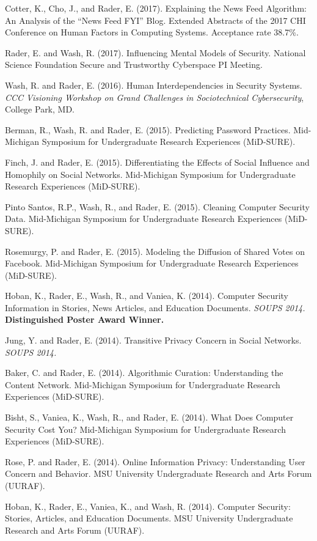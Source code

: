 \documentclass[9pt]{extarticle}
\begin{document}
Cotter, K., Cho, J., and Rader, E. (2017). Explaining the News Feed Algorithm: An Analysis of the ``News Feed FYI'' Blog. Extended Abstracts of the 2017 CHI Conference on Human Factors in Computing Systems. Acceptance rate 38.7\%.

Rader, E. and Wash, R. (2017). Influencing Mental Models of Security. National Science Foundation Secure and Trustworthy Cyberspace PI Meeting.

Wash, R. and Rader, E. (2016). Human Interdependencies in Security Systems. \emph{CCC Visioning Workshop on Grand Challenges in Sociotechnical Cybersecurity}, College Park, MD.

Berman, R., Wash, R. and Rader, E. (2015). Predicting Password Practices. Mid-Michigan Symposium for Undergraduate Research Experiences (MiD-SURE).

Finch, J. and Rader, E. (2015). Differentiating the Effects of Social Influence and Homophily on Social Networks. Mid-Michigan Symposium for Undergraduate Research Experiences (MiD-SURE).

Pinto Santos, R.P., Wash, R., and Rader, E. (2015). Cleaning Computer Security Data. Mid-Michigan Symposium for Undergraduate Research Experiences (MiD-SURE).

Rosemurgy, P. and Rader, E. (2015). Modeling the Diffusion of Shared Votes on Facebook. Mid-Michigan Symposium for Undergraduate Research Experiences (MiD-SURE).

Hoban, K., Rader, E., Wash, R., and Vaniea, K. (2014). Computer Security Information in Stories, News Articles, and Education Documents. \emph{SOUPS 2014.} \textbf{Distinguished Poster Award Winner.}

Jung, Y. and Rader, E. (2014). Transitive Privacy Concern in Social Networks. \emph{SOUPS 2014.}

Baker, C. and Rader, E. (2014). Algorithmic Curation: Understanding the Content Network. Mid-Michigan Symposium for Undergraduate Research Experiences (MiD-SURE).

Bisht, S., Vaniea, K., Wash, R., and Rader, E. (2014). What Does Computer Security Cost You? Mid-Michigan Symposium for Undergraduate Research Experiences (MiD-SURE).

Rose, P. and Rader, E. (2014). Online Information Privacy: Understanding User Concern and Behavior. MSU University Undergraduate Research and Arts Forum (UURAF).

Hoban, K., Rader, E., Vaniea, K., and Wash, R. (2014). Computer Security: Stories, Articles, and Education Documents. MSU University Undergraduate Research and Arts Forum (UURAF).
\end{document}
